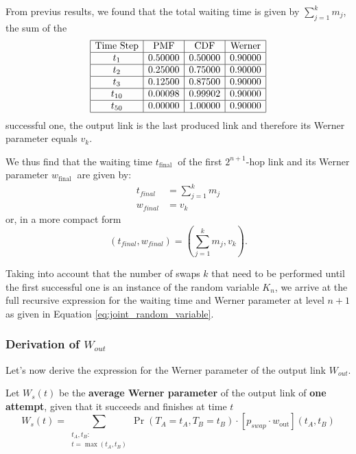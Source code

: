 \documentclass{masterthesis}
\begin{document}
From previus results, we found that the total waiting time is given by $\sum_{j=1}^{k} m_{j}$, the sum of the \begin{equation*}
    \begin{array}{|c|c|c|c|}
        \hline
        \text{Time Step} & \text{PMF} & \text{CDF} & \text{Werner} \\
        \hline
        t_1 & 0.50000 & 0.50000 & 0.90000 \\
        \hline
        t_2 & 0.25000 & 0.75000 & 0.90000 \\
        \hline
        t_3 & 0.12500 & 0.87500 & 0.90000 \\
        \hline
        t_{10} & 0.00098 & 0.99902 & 0.90000 \\
        \hline
        t_{50} & 0.00000 & 1.00000 & 0.90000 \\
        \hline
    \end{array}
\end{equation*}successful one, the output link is the last produced link and therefore its Werner parameter equals $v_{k}$. 

We thus find that the waiting time $t_{\text {final }}$ of the first $2^{n+1}$-hop link and its Werner parameter $w_{\text {final }}$ are given by:
\begin{align}
    t_{final} &= \sum_{j=1}^{k} m_{j} \\ 
    w_{final} &= v_k 
\end{align}
or, in a more compact form
\begin{equation}
    \left(t_{final}, w_{final}\right) = \left(\sum_{j=1}^{k} m_{j}, v_{k}\right) .
\end{equation}

Taking into account that the number of swaps $k$ that need to be performed until the first successful one is an instance of the random variable $K_{n}$, we arrive at the full recursive expression for the waiting time and Werner parameter at level $n+1$ as given in Equation \ref{eq:joint_random_variable}.

\subsubsection*{Derivation of $W_{out}$}
Let's now derive the expression for the Werner parameter of the output link $W_{out}$.

Let $W_{s}(t)$ be the \textbf{average Werner parameter} of the output link of \textbf{one attempt}, given that it succeeds and finishes at time $t$
\begin{equation}
    W_s(t) = \sum_{\substack{t_A, t_B:\\ t = \max(t_A, t_B)}} \Pr(T_A = t_A, T_B = t_B) \cdot [p_{swap} \cdot w_{\text{out}}](t_A, t_B)
\end{equation}
\end{document}
